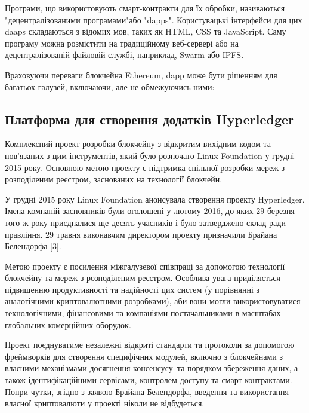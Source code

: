 \documentclass{lib/styles/default-style}
\begin{document}
    Програми, що використовують смарт-контракти для їх обробки, називаються "децентралізованими програмами"\enspace або "dapps".
    Користувацькі інтерфейси для цих daaps складаються з відомих мов, таких як HTML, CSS та JavaScript.
    Саму програму можна розмістити на традиційному веб-сервері або на децентралізованій файловій службі, наприклад, Swarm або IPFS.

    Враховуючи переваги блокчейна Ethereum, dapp може бути рішенням для багатьох галузей, включаючи, але не обмежуючись ними:


\subsection{Платформа для створення додатків Hyperledger}

    Комплексний проект розробки блокчейну з відкритим вихідним кодом та пов'язаних з цим інструментів,
    який було розпочато Linux Foundation у грудні 2015 року. Основною метою проекту є підтримка спільної
    розробки мереж з розподіленим реєстром, заснованих на технології блокчейн.
    
    У грудні 2015 року Linux Foundation анонсувала створення проекту Hyperledger.
    Імена компаній-засновників були оголошені у лютому 2016, до яких 29 березня того ж року приєдналися ще
    десять учасників і було затверджено склад ради правління. 29 травня виконавчим директором проекту призначили Брайана Белендорфа [3].
    
    Метою проекту є посилення міжгалузевої співпраці за допомогою технології блокчейну та мереж з розподіленим реєстром.
    Особлива увага приділяється підвищенню продуктивності та надійності цих систем (у порівнянні з аналогічними криптовалютними розробками),
    аби вони могли використовуватися технологічними, фінансовими та компаніями-постачальниками в масштабах глобальних комерційних оборудок. 
    
    Проект поєднуватиме незалежні відкриті стандарти та протоколи за допомогою фреймворків для створення специфічних модулей, включно з 
    блокчейнами з власними механізмами досягнення консенсусу та порядком збереження даних, а також ідентифікаційними сервісами, контролем
    доступу та смарт-контрактами. 	Попри чутки, згідно з заявою Брайана Белендорфа, введення та використання власної криптовалюти у проекті
    ніколи не відбудеться.
    
\end{document}
